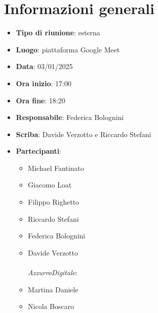 


\section{Informazioni generali}

\begin{itemize}
    \item \textbf{Tipo di riunione}: esterna
    \item \textbf{Luogo}: piattaforma Google Meet
    \item \textbf{Data}: 03/01/2025
    \item \textbf{Ora inizio}: 17:00
    \item \textbf{Ora fine}: 18:20
    \item \textbf{Responsabile}: Federica Bolognini
    \item \textbf{Scriba}: Davide Verzotto e Riccardo Stefani
    \item \textbf{Partecipanti}:
    \begin{itemize}
        \item Michael Fantinato
        \item Giacomo Loat
        \item Filippo Righetto
        \item Riccardo Stefani
        \item Federica Bolognini
        \item Davide Verzotto \\ \\
        \emph{AzzurroDigitale}:
        \item Martina Daniele
        \item Nicola Boscaro
    \end{itemize}
\end{itemize}
